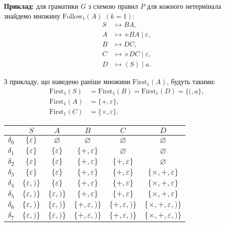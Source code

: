 \textbf{Приклад:} для граматики $G$ з схемою правил $P$ для кожного нетермінала знайдемо множину $\text{Follow}_1(A)$ $(k=1)$:
\begin{align}
	S &\mapsto BA, \\
	A &\mapsto +BA \mid \varepsilon, \\
	B &\mapsto DC, \\
	C &\mapsto \times DC \mid \varepsilon, \\
	D &\mapsto (S) \mid a.
\end{align}

З прикладу, що наведено раніше множини $\text{First}_1(A)$, будуть такими:
\begin{align}
	\text{First}_1 (S) &= \text{First}_1 (B) = \text{First}_1 (D) = \{(, a\}, \\
	\text{First}_1 (A) &= \{+, \varepsilon\}, \\
	\text{First}_1 (C) &= \{\times, \varepsilon\}.
\end{align}

\begin{table}[H]
	\centering
	\begin{tabular}{|c|c|c|c|c|c|}
		\hline
		& $S$ & $A$ & $B$ & $C$ & $D$ \\ \hline
		$\delta_0$ & $\{\varepsilon\}$ & $\varnothing$ & $\varnothing$ & $\varnothing$ & $\varnothing$ \\ \hline
		$\delta_1$ & $\{\varepsilon\}$ & $\{\varepsilon\}$ & $\{+,\varepsilon\}$ & $\varnothing$ & $\varnothing$ \\ \hline
		$\delta_2$ & $\{\varepsilon\}$ & $\{\varepsilon\}$ & $\{+,\varepsilon\}$ & $\{+,\varepsilon\}$ & $\varnothing$ \\ \hline
		$\delta_3$ & $\{\varepsilon\}$ & $\{\varepsilon\}$ & $\{+,\varepsilon\}$ & $\{+,\varepsilon\}$ & $\{\times,+,\varepsilon\}$ \\ \hline
		$\delta_4$ & $\{\varepsilon,)\}$ & $\{\varepsilon\}$ & $\{+,\varepsilon\}$ & $\{+,\varepsilon\}$ & $\{\times,+,\varepsilon\}$ \\ \hline
		$\delta_5$ & $\{\varepsilon,)\}$ & $\{\varepsilon,)\}$ & $\{+,\varepsilon\}$ & $\{+,\varepsilon\}$ & $\{\times,+,\varepsilon\}$ \\ \hline
		$\delta_6$ & $\{\varepsilon,)\}$ & $\{\varepsilon,)\}$ & $\{+,\varepsilon,)\}$ & $\{+,\varepsilon,)\}$ & $\{\times,+,\varepsilon,)\}$ \\ \hline
		$\delta_7$ & $\{\varepsilon,)\}$ & $\{\varepsilon,)\}$ & $\{+,\varepsilon,)\}$ & $\{+,\varepsilon,)\}$ & $\{\times,+,\varepsilon,)\}$ \\ \hline
	\end{tabular}
\end{table}

